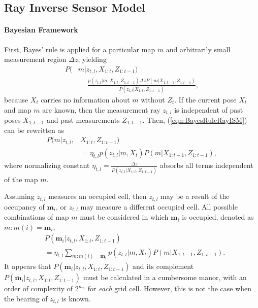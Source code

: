 \documentclass[letterpaper, 10pt, conference]{ieeeconf}
\newcommand{\refeqn}[1]{(\ref{eqn:#1})}
\begin{document}
\subsection{Ray Inverse Sensor Model}

\paragraph{Bayesian Framework}
First, Bayes' rule is applied for a particular map $m$ and arbitrarily small measurement region $\Delta z$, yielding
\begin{align}
\label{eqn:BayesRuleRayISM}
P(&m|z_{t,l},X_{1:t},Z_{1:t-1})\nonumber
\\
&=\frac{p(z_{t,l}|m,X_{1:t},Z_{1:t-1})\Delta zP(m|X_{1:t-1},Z_{1:t-1})}{P(z_{t,l}|X_{1:t},Z_{1:t-1})},
\end{align}
because $X_t$ carries no information about $m$ without $Z_t$.
If the current pose $X_t$ and map $m$ are known, then the measurement ray $z_{t,l}$ is independent of past poses $X_{1:t-1}$ and past measurements $Z_{1:t-1}$.
Then, \refeqn{BayesRuleRayISM} can be rewritten as
\begin{align}
P(m|z_{t,l},&X_{1:t},Z_{1:t-1})\nonumber
\\
&
=\eta_{t,l}p(z_{t,l}|m,X_{t})P(m|X_{1:t-1},Z_{1:t-1}),
\end{align}
where normalizing constant $\eta_{t,l}=\frac{\Delta z}{P(z_{t,l}|X_{1:t},Z_{1:t-1})}$ absorbs all terms independent of the map $m$.

Assuming $z_{t,l}$ measures an occupied cell, then $z_{t,l}$ may be a result of the occupancy of $\mathbf{m}_i$, or $z_{t,l}$ may measure a different occupied cell.
All possible combinations of map $m$ must be considered in which $\mathbf{m}_i$ is occupied, denoted as $m:m(i)=\mathbf{m}_i$,
\begin{align}
\label{eqn:InvSenModWithProbDens}
&P(\mathbf{m}_i|z_{t,l},X_{1:t},Z_{1:t-1})\nonumber
\\
&=\eta_{t,l}\sum_{m:m(i)=\mathbf{m}_i}p(z_{t,l}|m,X_{t})P(m|X_{1:t-1},Z_{1:t-1}).
\end{align}
It appears that $P(\mathbf{m}_i|z_{t,l},X_{1:t},Z_{1:t-1})$ and its complement $P(\bar{\mathbf{m}}_i|z_{t,l},X_{1:t},Z_{1:t-1})$ must be calculated in a cumbersome manor, with an order of complexity of $2^{n_m}$ for \emph{each} grid cell.
However, this is not the case when the bearing of $z_{t,l}$ is known.
	
\end{document}
